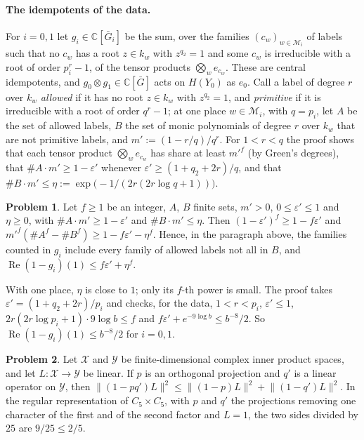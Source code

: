 \documentclass[reqno]{amsart}
\theoremstyle{plain}
\theoremstyle{definition}
\newtheorem{problem}{Problem}[section]
\theoremstyle{remark}
\newcommand{\C}{\mathbb{C}}
\newcommand{\Gb}{\bar G}
\newcommand{\Mcal}{\mathcal M}
\begin{document}
\paragraph{The idempotents of the data.}  For \(i = 0, 1\) let \(g_i \in \C[\Gb_i]\) be the sum, over the families \((c_w)_{w \in \Mcal_i}\) of labels such that no \(c_w\) has a root \(z \in k_w\) with \(z^{q_2} = 1\) and some \(c_w\) is irreducible with a root of order \(p_i^r - 1\), of the tensor products \(\bigotimes_w e_{c_w}\).  These are central idempotents, and \(g_0 \otimes g_1 \in \C[\Gb]\) acts on \(H(Y_0)\) as \(e_0\).  Call a label of degree \(r\) over \(k_w\) \emph{allowed} if it has no root \(z \in k_w\) with \(z^{q_2} = 1\), and \emph{primitive} if it is irreducible with a root of order \(q^r - 1\); at one place \(w \in \Mcal_i\), with \(q = p_i\), let \(A\) be the set of allowed labels, \(B\) the set of monic polynomials of degree \(r\) over \(k_w\) that are not primitive labels, and \(m' := (1 - r/q)/q^r\).  For \(1 < r < q\) the proof shows that each tensor product \(\bigotimes_w e_{c_w}\) has share at least \(m'^f\) (by Green's degrees), that \(\#A\cdot m' \ge 1 - \varepsilon'\) whenever \(\varepsilon' \ge (1 + q_2 + 2r)/q\), and that \(\#B\cdot m' \le \eta := \exp\bigl(-1/(2r(2r\log q + 1))\bigr)\).

\begin{problem}\label{pr:bernoulli}
Let \(f \ge 1\) be an integer, \(A\), \(B\) finite sets, \(m' > 0\), \(0 \le \varepsilon' \le 1\) and \(\eta \ge 0\), with \(\#A\cdot m' \ge 1 - \varepsilon'\) and \(\#B\cdot m' \le \eta\).  Then \((1 - \varepsilon')^f \ge 1 - f\varepsilon'\) and \(m'^f(\#A^f - \#B^f) \ge 1 - f\varepsilon' - \eta^f\).  Hence, in the paragraph above, the families counted in \(g_i\) include every family of allowed labels not all in \(B\), and \(\operatorname{Re}(1 - g_i)(1) \le f\varepsilon' + \eta^f\).
\end{problem}

With one place, \(\eta\) is close to \(1\); only its \(f\)-th power is small.  The proof takes \(\varepsilon' = (1 + q_2 + 2r)/p_i\) and checks, for the data, \(1 < r < p_i\), \(\varepsilon' \le 1\), \(2r(2r\log p_i + 1)\cdot 9\log b \le f\) and \(f\varepsilon' + e^{-9\log b} \le b^{-8}/2\).  So \(\operatorname{Re}(1 - g_i)(1) \le b^{-8}/2\) for \(i = 0, 1\).

\begin{problem}\label{pr:two-proj}
Let \(\mathcal X\) and \(\mathcal Y\) be finite-dimensional complex inner product spaces, and let \(L\colon\mathcal X\to\mathcal Y\) be linear.  If \(p\) is an orthogonal projection and \(q'\) is a linear operator on \(\mathcal Y\), then \(\lVert(1-pq')L\rVert^2\le\lVert(1-p)L\rVert^2+\lVert(1-q')L\rVert^2\).  In the regular representation of \(C_5 \times C_5\), with \(p\) and \(q'\) the projections removing one character of the first and of the second factor and \(L = 1\), the two sides divided by \(25\) are \(9/25 \le 2/5\).
\end{problem}
\end{document}
